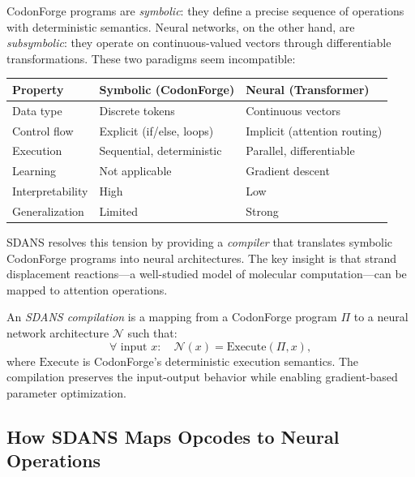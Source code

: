 CodonForge programs are \emph{symbolic}: they define a precise sequence of operations with deterministic semantics. Neural networks, on the other hand, are \emph{subsymbolic}: they operate on continuous-valued vectors through differentiable transformations. These two paradigms seem incompatible:

\begin{center}
\renewcommand{\arraystretch}{1.15}
\begin{tabularx}{0.9\textwidth}{L{4cm} Y Y}
\toprule
\textbf{Property} & \textbf{Symbolic (CodonForge)} & \textbf{Neural (Transformer)} \\
\midrule
Data type & Discrete tokens & Continuous vectors \\
Control flow & Explicit (if/else, loops) & Implicit (attention routing) \\
Execution & Sequential, deterministic & Parallel, differentiable \\
Learning & Not applicable & Gradient descent \\
Interpretability & High & Low \\
Generalization & Limited & Strong \\
\bottomrule
\end{tabularx}
\end{center}

SDANS resolves this tension by providing a \emph{compiler} that translates symbolic CodonForge programs into neural architectures. The key insight is that strand displacement reactions---a well-studied model of molecular computation---can be mapped to attention operations.

\begin{definition}
\label{def:sdans}
An \emph{SDANS compilation} is a mapping from a CodonForge program $\Pi$ to a neural network architecture $\mathcal{N}$ such that:
\begin{equation}
\forall \text{ input } x: \quad \mathcal{N}(x) = \text{Execute}(\Pi, x),
\end{equation}
where $\text{Execute}$ is CodonForge's deterministic execution semantics. The compilation preserves the input-output behavior while enabling gradient-based parameter optimization.
\end{definition}

\subsection{How SDANS Maps Opcodes to Neural Operations}
\label{subsec:sdans-mapping}

